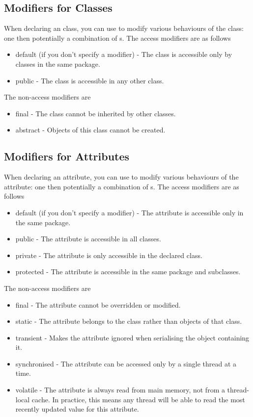 \documentclass[11pt]{article}
\begin{document}
\subsection{Modifiers for Classes}
When declaring an class, you can use  to modify various behaviours of the class: one  then potentially a combination of s. The access modifiers are as follows
\begin{itemize}
    \item default (if you don't specify a modifier) - The class is accessible only by classes in the same package.
    \item public - The class is accessible in any other class.
\end{itemize}
The non-access modifiers are
\begin{itemize}
    \item final - The class cannot be inherited by other classes.
    \item abstract - Objects of this class cannot be created.
\end{itemize}


\subsection{Modifiers for Attributes}
When declaring an attribute, you can use  to modify various behaviours of the attribute: one  then potentially a combination of s. The access modifiers are as follows
\begin{itemize}
    \item default (if you don't specify a modifier) - The attribute is accessible only in the same package.
    \item public - The attribute is accessible in all classes.
    \item private - The attribute is only accessible in the declared class.
    \item protected - The attribute is accessible in the same package and subclasses.
\end{itemize}
The non-access modifiers are
\begin{itemize}
    \item final - The attribute cannot be overridden or modified.
    \item static - The attribute belongs to the class rather than objects of that class.
    \item transient - Makes the attribute ignored when serialising the object containing it.
    \item synchronised - The attribute can be accessed only by a single thread at a time.
    \item volatile - The attribute is always read from main memory, not from a thread-local cache. In practice, this means any thread will be able to read the most recently updated value for this attribute.
\end{itemize}
\end{document}

